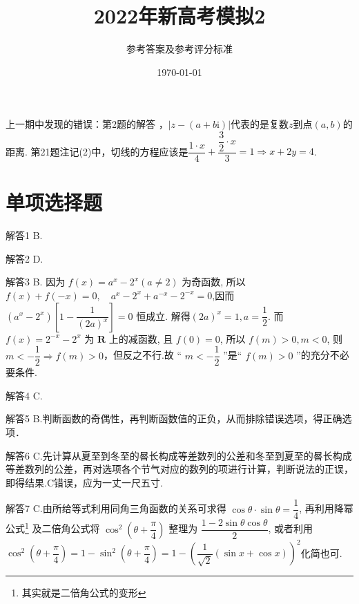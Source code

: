 \documentclass[11pt]{article}
\title{\heiti 2022年新高考模拟2}
\author{\heiti 参考答案及参考评分标准}
\date{\today}
\begin{document}
	\maketitle

上一期中发现的错误：第2题的\heiti 解答 \songti，$\left | z-(a+b\mathrm{i} ) \right | $代表的是复数$z$到点$(a,b)$的距离. 第21题注记(2)中，切线的方程应该是$ \dfrac{1\cdot x}{4} +\dfrac{\dfrac{3}{2}\cdot x }{3} =1\Rightarrow x+2y=4 $.
\section{\heiti 单项选择题}
\begin{compactdesc}
	\item[解答1] B.
	\item[解答2] D.
	\item[解答3] B. 因为 $f(x)=a^{x}-2^{x}(a \neq 2)$ 为奇函数, 所以$f(x)+f(-x)=0, \quad a^{x}-2^{x}+a^{-x}-2^{-x}=0$,因而
	$\left(a^{x}-2^{x}\right)\left[1-\dfrac{1}{(2 a)^{x}}\right]=0$ 恒成立. 解得$(2 a)^{x}=1, a=\dfrac{1}{2}$.
	而$f(x)=2^{-x}-2^{x}$ 为 $\mathbf{R}$ 上的减函数, 且 $f(0)=0$,
	所以 $f(m)>0, m<0$, 则$m<-\dfrac{1}{2}\Rightarrow f(m)>0$，但反之不行.故 “ $m<-\dfrac{1}{2}$ ”是“ $f(m)>0$ ”的充分不必要条件.
	\item[解答4] C.
	\item[解答5] B.判断函数的奇偶性，再判断函数值的正负，从而排除错误选项，得正确选项．
	\item[解答6] C.先计算从夏至到冬至的晷长构成等差数列的公差和冬至到夏至的晷长构成等差数列的公差，再对选项各个节气对应的数列的项进行计算，判断说法的正误，即得结果.C错误，应为一丈一尺五寸.
	\item[解答7] C.由所给等式利用同角三角函数的关系可求得 $\cos \theta \cdot \sin \theta=\dfrac{1}{4}$, 再利用\heiti 降幂公式\footnote{其实就是二倍角公式的变形} \songti 及二倍角公式将 $\cos ^{2}\left(\theta+\dfrac{\pi}{4}\right)$ 整理为 $\dfrac{1-2 \sin \theta \cos \theta}{2}$, 或者利用$\cos ^2\left ( \theta +\dfrac{\pi }{4}  \right ) 
	=1-\sin ^2\left ( \theta +\dfrac{\pi }{4}  \right )
	=1-\left ( \dfrac{1}{\sqrt{2}}\left ( \sin x+\cos x \right )\right )^2 $化简也可.
		

\end{compactdesc}
\end{document}

